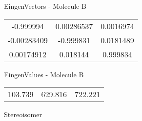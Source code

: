 \begin{multicols}{2}
\begin{center}
\vtab
 EingenVectors - Molecule B     \\
\vtab
\begin{tabular}{|c c c|}
-0.999994	 & 	0.00286537	 & 	0.0016974	 \\
-0.00283409	 & 	-0.999831	 & 	0.0181489	 \\
0.00174912	 & 	0.018144	 & 	0.999834
\end{tabular}

\vtab
 EingenValues - Molecule B     \\
\vtab
\begin{tabular}{|c c c|}
103.739	 & 	629.816	 & 	722.221	 \\
\end{tabular}

\end{center}
\end{multicols}
\begin{center}
\vtab
\vtab
\textcolor{NavyBlue}{\Large Stereoisomer}
\end{center}

 \newpage

